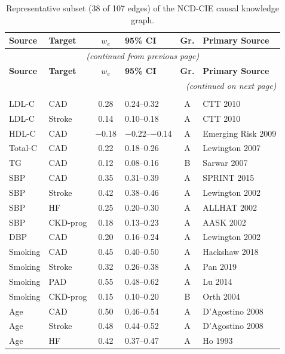 \documentclass[runningheads]{llncs}
\begin{document}
{\footnotesize
\renewcommand{\arraystretch}{1.05}
\begin{longtable}{@{}p{2.0cm}p{2.0cm}cp{1.4cm}cp{2.8cm}@{}}
\caption{Representative subset (38 of 107 edges) of the NCD-CIE causal knowledge graph.}\label{tab:edges}\\
\toprule
\textbf{Source} & \textbf{Target} & \textbf{$w_e$} & \textbf{95\% CI} & \textbf{Gr.} & \textbf{Primary Source} \\
\midrule
\endfirsthead
\multicolumn{6}{c}{\small\itshape (continued from previous page)} \\
\toprule
\textbf{Source} & \textbf{Target} & \textbf{$w_e$} & \textbf{95\% CI} & \textbf{Gr.} & \textbf{Primary Source} \\
\midrule
\endhead
\midrule
\multicolumn{6}{r}{\small\itshape (continued on next page)} \\
\endfoot
\bottomrule
\endlastfoot
\multicolumn{6}{l}{\textbf{CVD Domain (38 edges)}} \\
\midrule
LDL-C & CAD & 0.28 & 0.24--0.32 & A & CTT 2010 \\
LDL-C & Stroke & 0.14 & 0.10--0.18 & A & CTT 2010 \\
HDL-C & CAD & $-$0.18 & $-$0.22--$-$0.14 & A & Emerging Risk 2009 \\
Total-C & CAD & 0.22 & 0.18--0.26 & A & Lewington 2007 \\
TG & CAD & 0.12 & 0.08--0.16 & B & Sarwar 2007 \\
SBP & CAD & 0.35 & 0.31--0.39 & A & SPRINT 2015 \\
SBP & Stroke & 0.42 & 0.38--0.46 & A & Lewington 2002 \\
SBP & HF & 0.25 & 0.20--0.30 & A & ALLHAT 2002 \\
SBP & CKD-prog & 0.18 & 0.13--0.23 & A & AASK 2002 \\
DBP & CAD & 0.20 & 0.16--0.24 & A & Lewington 2002 \\
Smoking & CAD & 0.45 & 0.40--0.50 & A & Hackshaw 2018 \\
Smoking & Stroke & 0.32 & 0.26--0.38 & A & Pan 2019 \\
Smoking & PAD & 0.55 & 0.48--0.62 & A & Lu 2014 \\
Smoking & CKD-prog & 0.15 & 0.10--0.20 & B & Orth 2004 \\
Age & CAD & 0.50 & 0.46--0.54 & A & D'Agostino 2008 \\
Age & Stroke & 0.48 & 0.44--0.52 & A & D'Agostino 2008 \\
Age & HF & 0.42 & 0.37--0.47 & A & Ho 1993 \\

\end{longtable}}
\end{document}
